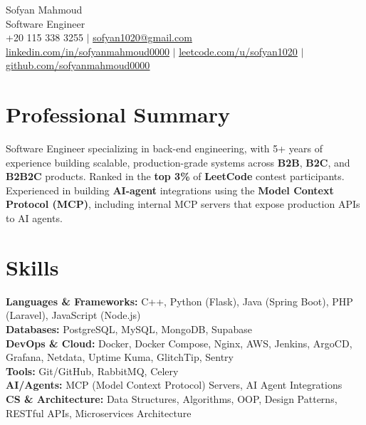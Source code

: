 \documentclass[a4paper,10pt]{article}
\begin{document}
\begin{center}
    {\Huge Sofyan Mahmoud} \\
    \vspace{0.05cm}
    {\Large{Software Engineer}} \\
    \vspace{0.1cm}
    +20 115 338 3255 $|$ \href{mailto:sofyan1020@gmail.com}{sofyan1020@gmail.com} \\
    \href{https://www.linkedin.com/in/sofyanmahmoud0000/}{\underline{linkedin.com/in/sofyanmahmoud0000}} $|$ \href{https://leetcode.com/u/sofyan1020/}{\underline{leetcode.com/u/sofyan1020}} $|$ \href{https://github.com/sofyanmahmoud0000}{\underline{github.com/sofyanmahmoud0000}}
\end{center}
\vspace{-0.4cm}

\section{Professional Summary}
\vspace{-0.1cm}
Software Engineer specializing in back-end engineering, with 5+ years of experience building scalable, production-grade systems across \textbf{B2B}, \textbf{B2C}, and \textbf{B2B2C} products. Ranked in the \textbf{top 3\%} of \textbf{LeetCode} contest participants. Experienced in building \textbf{AI-agent} integrations using the \textbf{Model Context Protocol (MCP)}, including internal MCP servers that expose production APIs to AI agents.
\vspace{-0.2cm}

\section{Skills}
\vspace{-0.1cm}
\textbf{Languages \& Frameworks:} C++, Python (Flask), Java (Spring Boot), PHP (Laravel), JavaScript (Node.js) \\
\textbf{Databases:} PostgreSQL, MySQL, MongoDB, Supabase \\
\textbf{DevOps \& Cloud:} Docker, Docker Compose, Nginx, AWS, Jenkins, ArgoCD, Grafana, Netdata, Uptime Kuma, GlitchTip, Sentry \\
\textbf{Tools:} Git/GitHub, RabbitMQ, Celery \\
\textbf{AI/Agents:} MCP (Model Context Protocol) Servers, AI Agent Integrations \\
\textbf{CS \& Architecture:} Data Structures, Algorithms, OOP, Design Patterns, RESTful APIs, Microservices Architecture
\vspace{-0.2cm}
\end{document}
